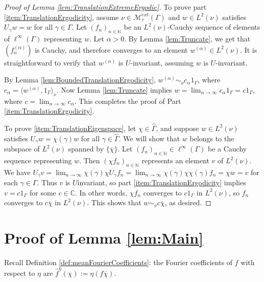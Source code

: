 \documentclass[12pt]{amsart} \usepackage{amsmath,centernot,amssymb,leftindex}
\numberwithin{theorem}{section}
\numberwithin{equation}{section}
\theoremstyle{definition}
\begin{document}
\begin{proof}[Proof of Lemma \ref{lem:TranslationExtremeErgodic}]
To prove part	\ref{item:TranslationErgodicity}, assume $\nu\in \mathcal M_{\tau}^{ext}(\Gamma)$  and $w\in L^2(\nu)$ satisfies $U_\gamma w = w$ for all $\gamma \in \Gamma$.  Let $(f_n)_{n\in \mathbb N}$ be an $L^2(\nu)$-Cauchy sequence of elements of $\ell^\infty(\Gamma)$ representing $w$.    Let $\alpha>0$.  By Lemma \ref{lem:Truncate}, we get that $(f_{n}^{(\alpha)})$ is Cauchy, and therefore converges to an element $w^{(\alpha)}\in L^{2}(\nu)$. It is straightforward to verify that $w^{(\alpha)}$ is $U$-invariant, assuming $w$ is $U$-invariant.

  By Lemma \ref{lem:BoundedTranslationErgodicity}, $w^{(\alpha)}\sim_\nu c_\alpha 1_\Gamma$, where $c_\alpha =\langle w^{(\alpha)}, 1_\Gamma\rangle_\nu$.  Now Lemma \ref{lem:Truncate} implies $w=\lim_{\alpha\to\infty} c_{\alpha} 1_{\Gamma}=c 1_{\Gamma}$, where $c=\lim_{\alpha\to\infty} c_{\alpha}$.  This completes the proof of Part \ref{item:TranslationErgodicity}.




To prove \ref{item:TranslationEigenspace}, let $\chi\in\widehat{\Gamma}$, and suppose $w\in L^2(\nu)$ satisfies $U_\gamma w=\chi(\gamma)w$ for all $\gamma\in\widehat{\Gamma}$.  We will show that $w$ belongs to the subspace of $L^{2}(\nu)$ spanned by $\{\overline{\chi}\}$. Let $(f_n)_{n\in \mathbb N}\in \ell^{\infty}(\Gamma)$ be a Cauchy sequence representing $w$.  Then $(\chi f_{n})_{n\in \mathbb N}$ represents an element $v$ of $L^{2}(\nu)$.  We have $U_{\gamma}v=\lim_{n\to\infty} \overline{\chi(\gamma)}\chi U_{\gamma}f_{n}=\lim_{n\to\infty} \overline{\chi(\gamma)}\chi\chi(\gamma)f_{n}=\chi w=v$ for each $\gamma \in \Gamma$.  Thus $v$ is $U$\text{-}invariant, so part \ref{item:TranslationErgodicity} implies $v=c1_{\Gamma}$ for some $c\in \mathbb C$.  In other words, $\chi f_{n}$ converges to $c1_{\Gamma}$ in $L^{2}(\nu)$, so $f_{n}$ converges to $c\overline{\chi}$ in $L^{2}(\nu)$.  This shows that $w\sim_{\nu} c\overline{\chi}$, as desired.  \end{proof}
	\section{Proof of Lemma \ref{lem:Main}}\label{sec:ProofOfMain}

	

	
	
	

	Recall Definition \ref{def:meanFourierCoefficients}:  the Fourier coefficients of $f$ with respect to $\eta$ are $	\hat{f}^{\eta}(\chi):=\eta(f\overline{\chi}).$  
	
\end{document}

